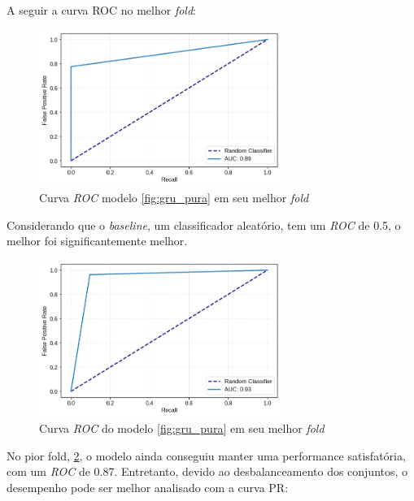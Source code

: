 \documentclass[
    12pt,                %
    openright,           %
    oneside,             %
    a4paper,             %
    brazil               %
]{abntex2}
\begin{document}
A seguir a curva ROC no melhor \textit{fold}:


\begin{figure}[H]
  \centering
   \includegraphics[width=0.7\textwidth]{figuras/modelos_resultados/gru/roc_gru_melhor_fold.png} %
  \caption{Curva \textit{ROC} modelo \ref{fig:gru_pura} em seu melhor \textit{fold}}
  \label{fig:roc_melhor_fold_gru}
\end{figure}

Considerando que o \textit{baseline}, um classificador aleatório, tem um \textit{ROC} de 0.5, o melhor foi significantemente melhor.

\begin{figure}[H]
  \centering
   \includegraphics[width=0.7\textwidth]{figuras/modelos_resultados/gru/roc_gru_pior_fold.png} %
  \caption{Curva \textit{ROC} do modelo \ref{fig:gru_pura} em seu melhor \textit{fold}}
  \label{fig:roc_pior_fold_gru}
\end{figure}

No pior fold, \ref{fig:roc_pior_fold_gru}, o modelo ainda conseguiu manter uma performance satisfatória, com um \textit{ROC} de 0.87. 
Entretanto, devido ao desbalanceamento dos conjuntos, o desempenho pode ser melhor analisado com a curva PR:
\end{document}

